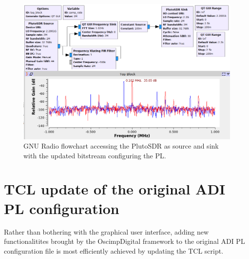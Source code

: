 \documentclass[12pt,oneside]{article}
\begin{document}
\begin{figure}[h!tb]
\includegraphics[width=\linewidth]{gnuradio.png}
\caption{GNU Radio flowchart accessing the PlutoSDR as source and sink with the updated
bitstream configuring the PL.}
\label{gnuradio}
\end{figure}

\section{TCL update of the original ADI PL configuration}

Rather than bothering with the graphical user interface, adding new functionalitites
brought by the OscimpDigital framework to the original ADI PL configuration file is most
efficiently achieved by updating the TCL script.
\end{document}
